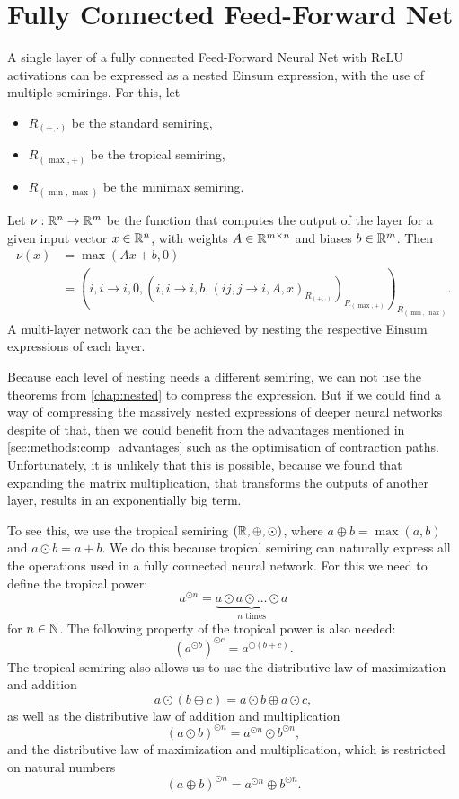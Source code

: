 \section{Fully Connected Feed-Forward Net}
A single layer of a fully connected Feed-Forward Neural Net with ReLU activations can be expressed as a nested Einsum expression, with the use of multiple semirings.
For this, let
\begin{itemize}
    \item $R_{(+, \cdot)}$ be the standard semiring,
    \item $R_{(\max, +)}$ be the tropical semiring,
    \item $R_{(\min, \max)}$ be the minimax semiring.
\end{itemize}
Let $\nu: \mathbb{R}^n \rightarrow \mathbb{R}^m$ be the function that computes the output of the layer for a given input vector $x \in \mathbb{R}^n$, with weights $A \in \mathbb{R}^{m \times n}$ and biases $b \in \mathbb{R}^m$.
Then
\begin{align*}
    \nu(x) & = \max(Ax + b, 0)                                                                                                                   \\
           & = (i,i\rightarrow i, 0, (i,i \rightarrow i, b, (ij, j \rightarrow i, A, x)_{R_{(+, \cdot)}} )_{R_{(\max, +)}} )_{R_{(\min, \max)}}.
\end{align*}
A multi-layer network can the be achieved by nesting the respective Einsum expressions of each layer.

Because each level of nesting needs a different semiring, we can not use the theorems from \autoref{chap:nested} to compress the expression.
But if we could find a way of compressing the massively nested expressions of deeper neural networks despite of that, then we could benefit from the advantages mentioned in \autoref{sec:methods:comp_advantages} such as the optimisation of contraction paths.
Unfortunately, it is unlikely that this is possible, because we found that expanding the matrix multiplication, that transforms the outputs of another layer, results in an exponentially big term.

To see this, we use the tropical semiring $(\mathbb{R}, \oplus, \odot)$, where $a \oplus b = \max(a,b)$ and $a \odot b = a + b$.
We do this because tropical semiring can naturally express all the operations used in a fully connected neural network.
For this we need to define the tropical power:
$$a^{\odot n} = \underbrace{a \odot a \odot \ldots \odot a}_{n \text{ times}}$$
for $n \in \mathbb{N}$. The following property of the tropical power is also needed:
$$\left(a^{\odot b}\right)^{\odot c} = a^{\odot(b + c)}.$$
The tropical semiring also allows us to use the distributive law of maximization and addition
$$a \odot (b \oplus c) = a \odot b \oplus a \odot c,$$
as well as the distributive law of addition and multiplication
$$(a \odot b)^{\odot n} = a^{\odot n} \odot b^{\odot n},$$
and the distributive law of maximization and multiplication, which is restricted on natural numbers
$$(a \oplus b)^{\odot n} = a^{\odot n} \oplus b^{\odot n}.$$


